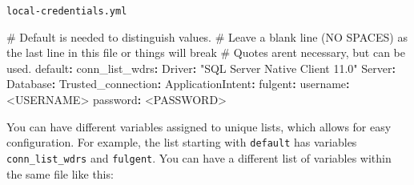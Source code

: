 \documentclass[
  letterpaper,
  DIV=11,
  numbers=noendperiod,
  oneside]{scrartcl}
\newenvironment{Shaded}{\begin{snugshade}}{\end{snugshade}}
\newcommand{\AttributeTok}[1]{\textcolor[rgb]{0.40,0.45,0.13}{#1}}
\newcommand{\CommentTok}[1]{\textcolor[rgb]{0.37,0.37,0.37}{#1}}
\newcommand{\FunctionTok}[1]{\textcolor[rgb]{0.28,0.35,0.67}{#1}}
\newcommand{\KeywordTok}[1]{\textcolor[rgb]{0.00,0.23,0.31}{\textbf{#1}}}
\newcommand{\StringTok}[1]{\textcolor[rgb]{0.13,0.47,0.30}{#1}}
\begin{document}
\begin{codelisting}

\caption{\texttt{local-credentials.yml}}

\begin{Shaded}
\begin{Highlighting}[]
\CommentTok{\# Default is needed to distinguish values.}
\CommentTok{\# Leave a blank line (NO SPACES) as the last line in this file or things will break}
\CommentTok{\# Quotes aren\textquotesingle{}t necessary, but can be used.}
\FunctionTok{default}\KeywordTok{:}\AttributeTok{ }
\AttributeTok{  }\FunctionTok{conn\_list\_wdrs}\KeywordTok{:}
\AttributeTok{    }\FunctionTok{Driver}\KeywordTok{:}\AttributeTok{ }\StringTok{"SQL Server Native Client 11.0"}
\AttributeTok{    }\FunctionTok{Server}\KeywordTok{:}\AttributeTok{ }
\AttributeTok{    }\FunctionTok{Database}\KeywordTok{:}\AttributeTok{ }
\AttributeTok{    }\FunctionTok{Trusted\_connection}\KeywordTok{:}\AttributeTok{ }
\AttributeTok{    }\FunctionTok{ApplicationIntent}\KeywordTok{:}\AttributeTok{ }
\AttributeTok{    }
\AttributeTok{  }\FunctionTok{fulgent}\KeywordTok{:}
\AttributeTok{    }\FunctionTok{username}\KeywordTok{:}\AttributeTok{ \textless{}USERNAME\textgreater{}}
\AttributeTok{    }\FunctionTok{password}\KeywordTok{:}\AttributeTok{ \textless{}PASSWORD\textgreater{}}
\end{Highlighting}
\end{Shaded}

\end{codelisting}

You can have different variables assigned to unique lists, which allows
for easy configuration. For example, the list starting with
\texttt{default} has variables \texttt{conn\_list\_wdrs} and
\texttt{fulgent}. You can have a different list of variables within the
same file like this:
\end{document}
